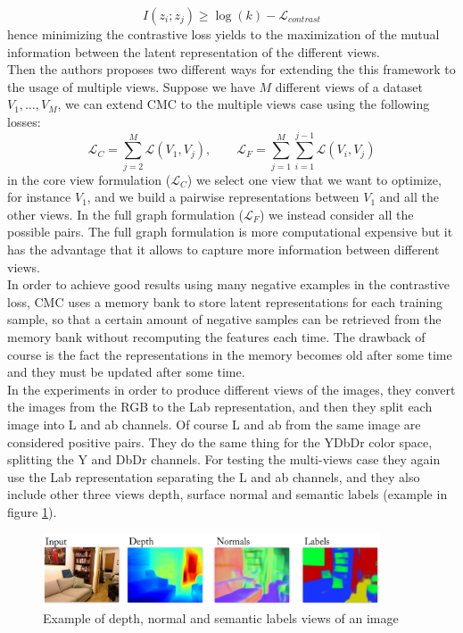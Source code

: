 \[I(z_i;z_j) \ge \log(k) - \mathcal{L}_{contrast} \]
hence minimizing the contrastive loss yields to the maximization of the mutual information between the latent representation of the different views.\\
Then the authors proposes two different ways for extending the this framework to the usage of multiple views. Suppose we have $M$ different views of a dataset $V_1, \dots, V_M$, we can extend CMC to the multiple views case using the following losses:
\[ \mathcal{L}_C = \sum_{j=2}^{M} \mathcal{L}(V_1, V_j), \qquad \mathcal{L}_F = \sum_{j=1}^{M} \sum_{i=1}^{j-1} \mathcal{L}(V_i, V_j)\]
in the core view formulation ($\mathcal{L}_C$) we select one view that we want to optimize, for instance $V_1$, and we build a pairwise representations between $V_1$ and all the other views. In the full graph formulation ($\mathcal{L}_F$) we instead consider all the possible pairs. The full graph formulation is more computational expensive but it has the advantage that it allows to capture more information between different views.\\
In order to achieve good results using many negative examples in the contrastive loss, CMC uses a memory bank to store latent representations for each training sample, so that a certain amount of negative samples can be retrieved from the memory bank without recomputing the features each time. The drawback of course is the fact the representations in the memory becomes old after some time and they must be updated after some time.\\
In the experiments in order to produce different views of the images, they convert the images from the RGB to the Lab representation, and then they split each image into L and ab channels. Of course L and ab from the same image are considered positive pairs. They do the same thing for the YDbDr color space, splitting the Y and DbDr channels. For testing the multi-views case they again use the Lab representation separating the L and ab channels, and they also include other three views depth, surface normal and semantic labels (example in figure \ref{fig:cmc-views}).
\begin{figure}[H]
	\centering
	\includegraphics[width=10cm]{./images/cmc-views.png}
	\caption{Example of depth, normal and semantic labels views of an image}
	\label{fig:cmc-views}
\end{figure}
